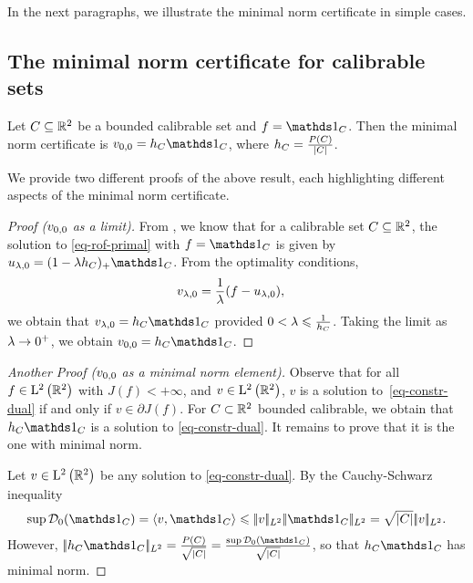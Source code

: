 In the next paragraphs, we illustrate the minimal norm certificate in simple cases.

\subsection{The minimal norm certificate for calibrable sets}
\begin{prop}\label{prop:mincertcalib}
  Let $C\subseteq \mathbb{R}^2$ be a bounded calibrable set and $f=\bun{C}$. Then the minimal norm certificate is $\voo=h_C\bun{C}$, where $h_C=\frac{P(C)}{\left| C \right|}$.
  \label{prop-mincertif-calib}
\end{prop}
We provide two different proofs of the above result, each highlighting different aspects of the minimal norm certificate.

\begin{proof}[Proof ($v_{0,0}$ as a limit)]
From \cite{beltvflow02}, we know that for a calibrable set $C\subseteq \mathbb{R}^2$, the solution to \eqref{eq-rof-primal} with $f=\bun{C}$ is given by $\ulao = (1 -\la h_C)_+ \bun{C}$.
From the optimality conditions,
\begin{align*}
    v_{\lambda,0} &= \frac{1}{\lambda}(f-u_{\lambda,0}),
\end{align*}
we obtain that $\vlao =h_C\bun{C}$ provided $0< \lambda \leqslant \frac{1}{h_C}$. Taking the limit as $\lambda \to 0^+$, we obtain $\voo=h_C\bun{C}$.
\end{proof}
\begin{proof}[Another Proof ($v_{0,0}$ as a minimal norm element)]
  Observe that for all $f\in \mathrm{L}^2\left(\mathbb{R}^2\right)$ with $J(f)<+\infty$, and $v\in \mathrm{L}^2\left(\mathbb{R}^2\right)$, $v$ is a solution to~\eqref{eq-constr-dual} if and only if $v\in \partial J(f)$. For $C\subset \mathbb{R}^2$ bounded calibrable, we obtain that $h_C \bun{C}$ is a solution to \eqref{eq-constr-dual}. It remains to prove that it is the one with minimal norm. 
   
Let $v\in \mathrm{L}^2\left(\mathbb{R}^2\right)$ be any solution to \eqref{eq-constr-dual}. By the Cauchy-Schwarz inequality
\begin{align*}
  \sup \Dd_0(\bun{C}) = \langle v,\bun{C}\rangle \leq \normLdeux{v}\normLdeux{\bun{C}}= \sqrt{|C|} \normLdeux{v}.
\end{align*}
However, $\normLdeux{h_C\bun{C}}=\frac{P(C)}{\sqrt{|C|}}= \frac{\sup \Dd_0(\bun{C})}{\sqrt{|C|}}$, so that $h_C\bun{C}$ has minimal norm.
\end{proof}

